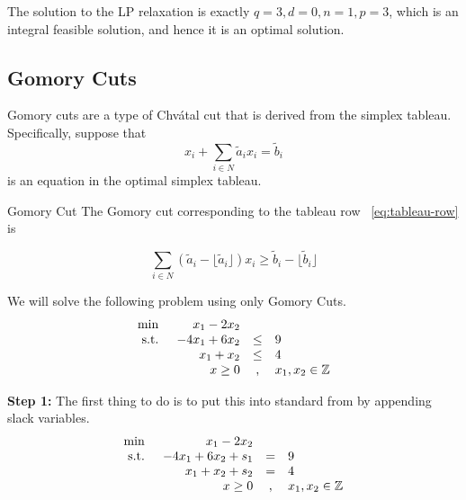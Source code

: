 \begin{example}{}{}
The solution to the LP relaxation is exactly $q = 3, d = 0, n = 1, p = 3$, which is an integral feasible solution, and hence it is an optimal solution.
\end{example}


\subsection{Gomory Cuts}
Gomory cuts are a type of Chv\'atal cut that is derived from the simplex tableau.  Specifically, suppose that 
\begin{equation}
\label{eq:tableau-row}
 x_i + \sum_{i\in N} \tilde a_i x_i = \tilde b_i
\end{equation}
is an equation in the optimal simplex tableau. 

\begin{general}{Gomory Cut}{}
The Gomory cut corresponding to the tableau row ~\eqref{eq:tableau-row} is

\begin{equation}
\label{eq:gomory-cut}
\sum_{i\in N} (\tilde a_i - \lfloor \tilde a_i \rfloor) x_i \geq \tilde b_i - \lfloor \tilde b_i\rfloor
\end{equation}


\end{general}


We will solve the following problem using only Gomory Cuts.
\begin{equation*}
\begin{array}{lrcl}
\min & x_1 - 2x_2\\
\mbox{ s.t. } & -4x_1 + 6x_2  & \leq & 9\\
& x_1 + x_2   & \leq & 4\\
& x \geq 0 & , & x_1,x_2 \in {\mathbb{Z}}
\end{array}
\end{equation*}

\textbf{Step 1:} The first thing to do is to put this into standard from by appending slack variables.
\begin{equation}
\label{eq:gomory-standard-form}
\begin{array}{lrcl}
\min & x_1 - 2x_2\\
\mbox{ s.t. } & -4x_1 + 6x_2 + s_1 & = & 9\\
& x_1 + x_2 + s_2  & = & 4\\
& x \geq 0 & , & x_1,x_2 \in {\mathbb{Z}}
\end{array}
\end{equation}

